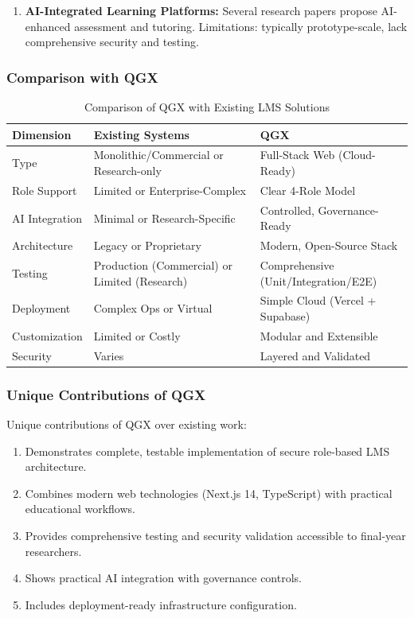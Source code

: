 \documentclass[11pt,a4paper]{article}
\begin{document}
\begin{enumerate}
    \item \textbf{AI-Integrated Learning Platforms:} Several research papers propose AI-enhanced assessment and tutoring. Limitations: typically prototype-scale, lack comprehensive security and testing.
\end{enumerate}

\subsubsection{Comparison with QGX}

\begin{table}[h!]
\centering
\caption{Comparison of QGX with Existing LMS Solutions}
\label{tab:comparison}
\begin{tabularx}{\textwidth}{|l|X|X|}
\hline
\textbf{Dimension} & \textbf{Existing Systems} & \textbf{QGX} \\
\hline
Type & Monolithic/Commercial or Research-only & Full-Stack Web (Cloud-Ready) \\
\hline
Role Support & Limited or Enterprise-Complex & Clear 4-Role Model \\
\hline
AI Integration & Minimal or Research-Specific & Controlled, Governance-Ready \\
\hline
Architecture & Legacy or Proprietary & Modern, Open-Source Stack \\
\hline
Testing & Production (Commercial) or Limited (Research) & Comprehensive (Unit/Integration/E2E) \\
\hline
Deployment & Complex Ops or Virtual & Simple Cloud (Vercel + Supabase) \\
\hline
Customization & Limited or Costly & Modular and Extensible \\
\hline
Security & Varies & Layered and Validated \\
\hline
\end{tabularx}
\end{table}

\subsubsection{Unique Contributions of QGX}

Unique contributions of QGX over existing work:

\begin{enumerate}
    \item Demonstrates complete, testable implementation of secure role-based LMS architecture.
    \item Combines modern web technologies (Next.js 14, TypeScript) with practical educational workflows.
    \item Provides comprehensive testing and security validation accessible to final-year researchers.
    \item Shows practical AI integration with governance controls.
    \item Includes deployment-ready infrastructure configuration.
\end{enumerate}
\end{document}
